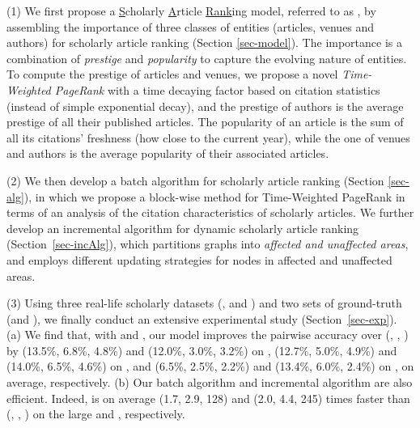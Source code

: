 \sstab(1) We first  propose a \underline{S}cholarly \underline{A}rticle \underline{Rank}ing model, referred to as \ensemblerank, by assembling the importance of three classes of entities (articles, venues and authors) for scholarly article ranking (Section \ref{sec-model}).
%
The importance is a combination of {\em prestige} and {\em popularity} to capture the evolving nature of entities.
%
To compute the prestige of articles and venues, we propose a novel {\em Time-Weighted PageRank} with a time decaying factor based on citation statistics (instead of simple exponential decay), and the prestige of authors is the average prestige of all their published articles.
%
The popularity of an article is the sum of all its citations' freshness (how close to the current year), while the one of venues and authors is the average popularity of their associated articles.
%
%

\sstab(2)  We then develop  a batch algorithm for scholarly article ranking (Section \ref{sec-alg}), in which we propose a block-wise method for Time-Weighted PageRank in terms of an analysis of the citation characteristics of scholarly articles.
%
We further develop an incremental algorithm for dynamic scholarly article ranking (Section~\ref{sec-incAlg}), which partitions graphs into  {\em affected and unaffected areas}, and employs different updating strategies for nodes in affected and unaffected areas.


\sstab(3) Using three real-life scholarly datasets (\aan, \aminer and \magdata) and two sets of ground-truth (\recom and \fcita), we finally conduct an extensive experimental study (Section~\ref{sec-exp}).
(a) We find that, with \recom and \fcita, our model \ensemblerank improves the pairwise accuracy \cite{Richardson06:BPR} over (\pagerank \cite{Brin98:PageRank}, \futurerank \cite{sayyadi09}, \hhgrank \cite{Liang16AAAI}) by
(13.5\%, 6.8\%, 4.8\%) and (12.0\%, 3.0\%, 3.2\%) on \aan,
(12.7\%, 5.0\%, 4.9\%) and (14.0\%, 6.5\%, 4.6\%) on \aminer, and
(6.5\%, 2.5\%, 2.2\%) and (13.4\%, 6.0\%, 2.4\%) on \magdata, on average, respectively.
%
(b) Our batch algorithm \batensemble and incremental algorithm \incensemble are also efficient. Indeed, \incensemble is on average (1.7, 2.9, 128) and (2.0, 4.4, 245) times faster than (\batensemble, \futurerank, \hhgrank)  on the large \aminer and \magdata, respectively.



